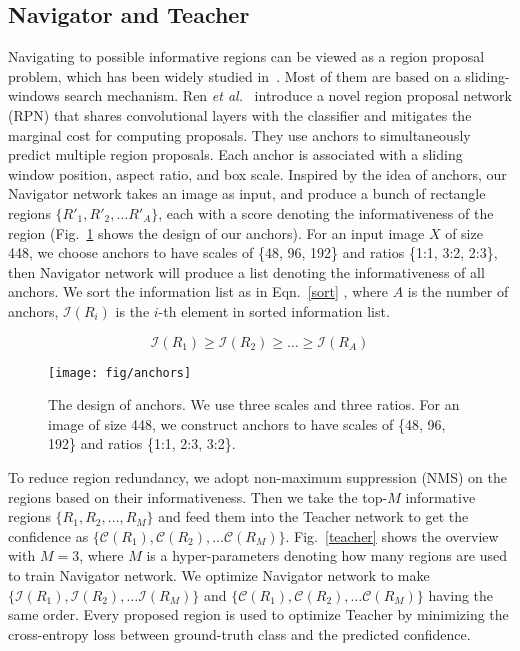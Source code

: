 \documentclass[runningheads]{llncs}
\begin{document}
\subsection{Navigator and Teacher}\label{sec_navigator_teacher}
Navigating to possible informative regions can be viewed as a region proposal problem, which has been widely studied in~\cite{Uijlings2013Selective,Endres2010Category,Arbelaez2014Multiscale,Carreira2012CPMC,NIPS2016_6532}. Most of them are based on a sliding-windows search mechanism. Ren \emph{et al.}~\cite{ren2015faster} introduce a novel region proposal network (RPN) that shares convolutional layers with the classifier and mitigates the marginal cost for computing proposals. They use anchors to simultaneously predict multiple region proposals. Each anchor is associated with a sliding window position, aspect ratio, and box scale. Inspired by the idea of anchors, our Navigator network takes an image as input, and produce a bunch of rectangle regions $\{R'_1, R'_2, \dots R'_A\}$, each with a score denoting the informativeness of the region (Fig.~\ref{anchors} shows the design of our anchors). For an input image $X$ of size 448, we choose anchors to have scales of \{48, 96, 192\} and ratios \{1:1, 3:2, 2:3\}, then Navigator network will produce a list denoting the informativeness of all anchors. We sort the information list as in Eqn.~\ref{sort} , where $A$ is the number of anchors, $\mathcal I(R_i)$ is the $i$-th element in sorted information list.

\begin{equation}\label{sort}
	\mathcal I(R_1) \geq \mathcal I(R_2) \geq \dots \geq \mathcal I(R_A)
\end{equation} 

\begin{figure}[ht]
\begin{center}
\texttt{[image: fig/anchors]}
\end{center}
   \caption{The design of anchors. We use three scales and three ratios. For an image of size 448, we construct anchors to have scales of \{48, 96, 192\} and ratios \{1:1, 2:3, 3:2\}.}
\label{anchors}
\end{figure}

To reduce region redundancy, we adopt non-maximum suppression (NMS) on the regions based on their informativeness. Then we take the top-$M$ informative regions $\{R_1, R_2, \dots, R_M\}$ and feed them into the Teacher network to get the confidence  as $\{\mathcal C(R_1), \mathcal C(R_2), \dots \mathcal C(R_M)\}$. Fig.~\ref{teacher} shows the overview with $M = 3$, where $M$ is a hyper-parameters denoting how many regions are used to train Navigator network. We optimize Navigator network to make $\{\mathcal I(R_1), \mathcal I(R_2), \dots \mathcal I(R_M)\}$ and $\{\mathcal C(R_1), \mathcal C(R_2), \dots \mathcal C(R_M)\}$ having the same order. Every proposed region is used to optimize Teacher by minimizing the cross-entropy loss between ground-truth class and the predicted confidence.
\end{document}
